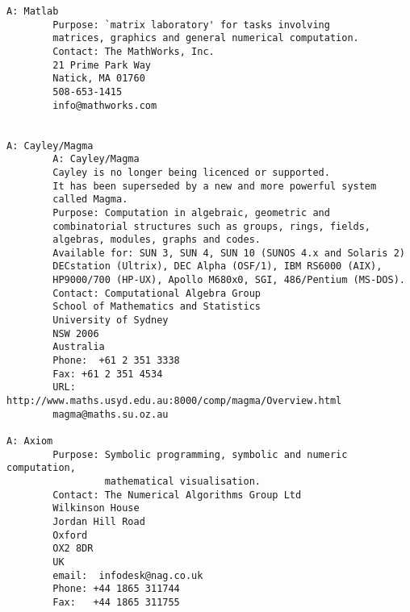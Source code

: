 \begin{verbatim}
A: Matlab
        Purpose: `matrix laboratory' for tasks involving
        matrices, graphics and general numerical computation.
        Contact: The MathWorks, Inc.
        21 Prime Park Way
        Natick, MA 01760
        508-653-1415
        info@mathworks.com


A: Cayley/Magma
        A: Cayley/Magma
        Cayley is no longer being licenced or supported.
        It has been superseded by a new and more powerful system
        called Magma.
        Purpose: Computation in algebraic, geometric and
        combinatorial structures such as groups, rings, fields,
        algebras, modules, graphs and codes.
        Available for: SUN 3, SUN 4, SUN 10 (SUNOS 4.x and Solaris 2)
        DECstation (Ultrix), DEC Alpha (OSF/1), IBM RS6000 (AIX),
        HP9000/700 (HP-UX), Apollo M680x0, SGI, 486/Pentium (MS-DOS).
        Contact: Computational Algebra Group
        School of Mathematics and Statistics
        University of Sydney
        NSW 2006
        Australia
        Phone:  +61 2 351 3338
        Fax: +61 2 351 4534
        URL: http://www.maths.usyd.edu.au:8000/comp/magma/Overview.html
        magma@maths.su.oz.au

A: Axiom
        Purpose: Symbolic programming, symbolic and numeric computation,
                 mathematical visualisation.
        Contact: The Numerical Algorithms Group Ltd
        Wilkinson House
        Jordan Hill Road
        Oxford
        OX2 8DR
        UK
        email:  infodesk@nag.co.uk
        Phone: +44 1865 311744
        Fax:   +44 1865 311755



\end{verbatim}


